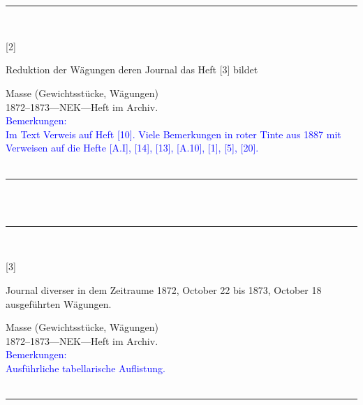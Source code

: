 \\
\vspace*{-2.5pt}\\
\parbox{\textwidth}{%
\rule{\textwidth}{1pt}\vspace*{-3mm}\\
\begin{minipage}[t]{0.1\textwidth}\vspace{0pt}
\Huge\rule[-4mm]{0cm}{1cm}[2]
\end{minipage}
\hfill
\begin{minipage}[t]{0.9\textwidth}\vspace{0pt}
\large Reduktion der Wägungen deren Journal das Heft [3] bildet\rule[-2mm]{0mm}{2mm}
\end{minipage}
{\footnotesize\flushright
Masse (Gewichtsstücke, Wägungen)\\
}
1872--1873\quad---\quad NEK\quad---\quad Heft im Archiv.\\
\textcolor{blue}{Bemerkungen:\\{}
Im Text Verweis auf Heft [10]. Viele Bemerkungen in roter Tinte aus 1887 mit Verweisen auf die Hefte [A.I], [14], [13], [A.10], [1], [5], [20].\\{}
}
\\[-15pt]
\rule{\textwidth}{1pt}
}
\\
\vspace*{-2.5pt}\\
\parbox{\textwidth}{%
\rule{\textwidth}{1pt}\vspace*{-3mm}\\
\begin{minipage}[t]{0.1\textwidth}\vspace{0pt}
\Huge\rule[-4mm]{0cm}{1cm}[3]
\end{minipage}
\hfill
\begin{minipage}[t]{0.9\textwidth}\vspace{0pt}
\large Journal diverser in dem Zeitraume 1872, October 22 bis 1873, October 18 ausgeführten Wägungen.\rule[-2mm]{0mm}{2mm}
\end{minipage}
{\footnotesize\flushright
Masse (Gewichtsstücke, Wägungen)\\
}
1872--1873\quad---\quad NEK\quad---\quad Heft im Archiv.\\
\textcolor{blue}{Bemerkungen:\\{}
Ausführliche tabellarische Auflistung.\\{}
}
\\[-15pt]
\rule{\textwidth}{1pt}
}
